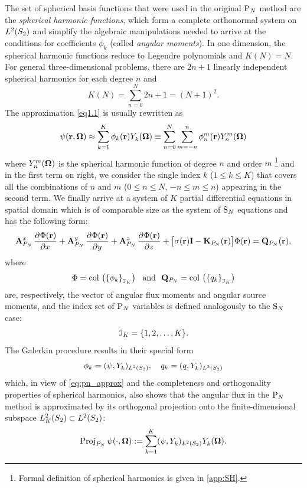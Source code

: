 The set of spherical basis functions that were used in the original $\PN$ method are the
\textit{spherical harmonic functions}, which form a complete orthonormal system on $\Lp[2](\Sphere)$ and simplify
the algebraic manipulations needed to arrive at the conditions for coefficients $\phi_k$ (called \textit{angular
moments}). In one dimension, the spherical harmonic functions reduce to Legendre polynomials and $ K(N) = N$. For
general three-dimensional problems, there are $2n + 1$ linearly independent spherical harmonics for each degree $n$ and
$$
	 K(N) = \sum_{n=0}^{N} 2n + 1 = (N+1)^2.
$$
The approximation \eqref{eq1.1} is usually rewritten as
\begin{equation}\label{eq:pn_approx}
	\psi(\br,\bomega) \approx \sum_{k=1}^{ K} \phi_k(\br)\Y{k}{}(\bomega) \equiv
	\suma[n]{0}{N}\suma[m]{-n}{n}\angmom{n}{m}(\br)\Y{n}{m}(\bomega)
\end{equation}
where $\Y{n}{m}(\bomega)$ is the spherical harmonic function of degree $n$ and order $m$ \footnote{Formal definition of
spherical harmonics is given in \ref{app:SH}.} and in the first term on right, we consider the single index $k$ ($1 \leq k \leq  K$) that covers all the combinations of $n$ and $m$  
($0 \leq n \leq N$, $-n\leq m \leq n$) appearing in the second term. We finally arrive at a system of $ K$
partial differential equations in spatial domain which is of comparable size as the system of $\SN$ equations and has the following form:
\begin{equation}\label{eq:pn1}
	\mat{A}^x_{P_N}\,\pd{\Phi(\br)}{x} + \mat{A}^y_{P_N}\,\pd{\Phi(\br)}{y} + \mat{A}^z_{P_N}\,\pd{\Phi(\br)}{z} +
	\bigl[\sigma(\br)\mat{I} - \mat{K}_{P_N}(\br)\bigr]\Phi(\br) = \mat{Q}_{P_N}(\br),
\end{equation}
where 
\begin{equation}\label{eq:pn_vectors}
	\Phi = \col\left(\left\{\phi_k\right\}_{\idxset{K}}\right) \ \text{ and }\ 
	\mat{Q}_{P_N} = \col\left(\left\{q_k\right\}_{\idxset{K}}\right) 
\end{equation}
are, respectively, the vector of angular flux
moments and angular source moments, and the index set of $\PN$ variables is defined analogously to the $\SN$ case:
$$
\idxset{K} = \{1,2,\ldots,K\}.
$$
The
Galerkin procedure results in their special form
\begin{equation}\label{eq:pn_angmom}
	\phi_k = (\psi, \Y{k}{})_{\Lp[2](\Sphere)},\quad q_k = (q, \Y{k}{})_{\Lp[2](\Sphere)}
\end{equation}
which, in view of \eqref{eq:pn_approx} and the completeness and orthogonality properties of spherical harmonics, also 
shows that the angular flux in the $\PN$ method is approximated by its orthogonal projection onto the finite-dimensional
subspace $\Lp[2]_K(\Sphere)\subset\Lp[2](\Sphere)$:
\begin{equation}\label{eq:PN_proj}
	\Projop\psi(\cdot,\bomega) := \sum_{k=1}^{ K}\ips{\psi}{\Y{k}{}} \Y{k}{}(\bomega).
\end{equation}

